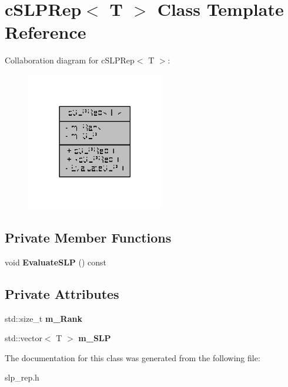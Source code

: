 \hypertarget{classcSLPRep}{\section{c\-S\-L\-P\-Rep$<$ T $>$ Class Template Reference}
\label{classcSLPRep}
}


Collaboration diagram for c\-S\-L\-P\-Rep$<$ T $>$\-:
\nopagebreak
\begin{figure}[H]
\begin{center}
\leavevmode
\includegraphics[width=170pt]{classcSLPRep__coll__graph}
\end{center}
\end{figure}
\subsection*{Private Member Functions}
\begin{DoxyCompactItemize}
\item 
\hypertarget{classcSLPRep_a426437f339e324639960d31d80a88c16}{void {\bfseries Evaluate\-S\-L\-P} () const }\label{classcSLPRep_a426437f339e324639960d31d80a88c16}

\end{DoxyCompactItemize}
\subsection*{Private Attributes}
\begin{DoxyCompactItemize}
\item 
\hypertarget{classcSLPRep_a5da028fd67619a049145140669a44eb1}{std\-::size\-\_\-t {\bfseries m\-\_\-\-Rank}}\label{classcSLPRep_a5da028fd67619a049145140669a44eb1}

\item 
\hypertarget{classcSLPRep_a8545e9ddf3197b62c4cd38fbae189a26}{std\-::vector$<$ T $>$ {\bfseries m\-\_\-\-S\-L\-P}}\label{classcSLPRep_a8545e9ddf3197b62c4cd38fbae189a26}

\end{DoxyCompactItemize}


The documentation for this class was generated from the following file\-:\begin{DoxyCompactItemize}
\item 
slp\-\_\-rep.\-h\end{DoxyCompactItemize}

